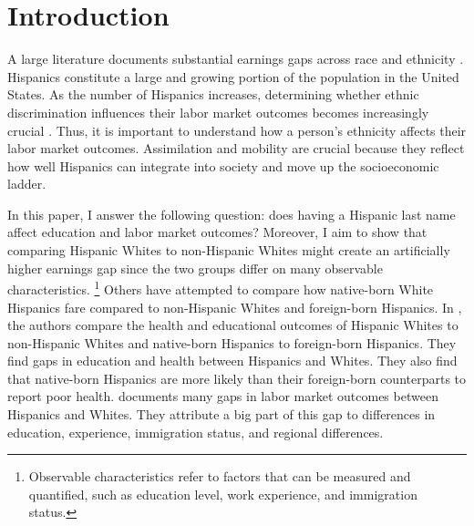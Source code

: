 \documentclass[a4paper,fleqn]{cas-sc}
\begin{document}

\section{Introduction}

A large literature documents substantial earnings gaps across race and ethnicity \citep{bayer2018divergent, charles2008prejudice, card1992school, fryer2004causes, rubinstein2014pride, bertrand2004emily, juhn1991accounting}. Hispanics constitute a large and growing portion of the population in the United States. As the number of Hispanics increases, determining whether ethnic discrimination influences their labor market outcomes becomes increasingly crucial \citep{chettyUnitedStatesStill2014, chettyEffectsExposureBetter2016,chettyFadingAmericanDream2017,abramitzkyImmigrantsAssimilateMore2020a, abramitzkyNationImmigrantsAssimilation2014,abramitzkyCulturalAssimilationAge2016,chettyWhereLandOpportunity2014}. Thus, it is important to understand how a person's ethnicity affects their labor market outcomes. Assimilation and mobility are crucial because they reflect how well Hispanics can integrate into society and move up the socioeconomic ladder.

In this paper, I answer the following question: does having a Hispanic last name affect education and labor market outcomes? Moreover, I aim to show that comparing Hispanic Whites to non-Hispanic Whites might create an artificially higher earnings gap since the two groups differ on many observable characteristics. \footnote{Observable characteristics refer to factors that can be measured and quantified, such as education level, work experience, and immigration status.} Others have attempted to compare how native-born White Hispanics fare compared to non-Hispanic Whites and foreign-born Hispanics. In \citet{antman2020ethnic,antmanEthnicAttritionObserved2016,antmanEthnicAttritionObserved2016a,antmanEthnicAttritionAssimilation2020}, the authors compare the health and educational outcomes of Hispanic Whites to non-Hispanic Whites and native-born Hispanics to foreign-born Hispanics. They find gaps in education and health between Hispanics and Whites. They also find that native-born Hispanics are more likely than their foreign-born counterparts to report poor health. \citet{davilaChangesRelativeEarnings2008} documents many gaps in labor market outcomes between Hispanics and Whites. They attribute a big part of this gap to differences in education, experience, immigration status, and regional differences. 
\end{document}
